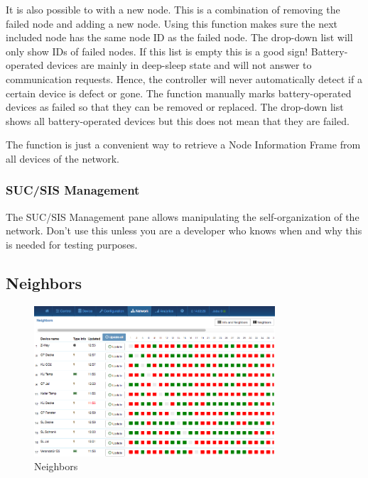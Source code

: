 {It is also possible to  with a new node. This is a combination 
of removing the failed node and adding a new node. Using this function makes sure the next 
included node has the same node ID as the failed node. The drop-down list will only show 
IDs of failed nodes. If this list is empty this is a good sign! Battery-operated devices 
are mainly in deep-sleep state and will not answer to communication requests. Hence, the 
controller will never automatically detect if a certain device is defect or gone. The 
function  manually marks battery-operated devices as 
failed so that they can be removed or replaced. The drop-down list shows all battery-operated 
devices but this does not mean that they are failed.

The  function is just a convenient way to retrieve a Node 
Information Frame from all devices of the network.

\subsubsection{SUC/SIS Management}

The SUC/SIS Management pane allows manipulating the self-organization of the \zwave network. 
Don’t use this unless you are a developer who knows when and why this is needed for testing purposes.

\subsection{Neighbors}

\begin{figure}
\begin{center}
\includegraphics[width=0.8\textwidth]{pngs/cap7/eui22.png}
\caption{Neighbors}
\label{eui22}
\end{center}
\end{figure}

}
